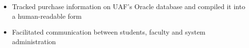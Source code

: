 \begin{itemize}
  \item Tracked purchase information on UAF's Oracle database and compiled it into a human-readable form
  \item Facilitated communication between students, faculty and system administration
\end{itemize}
